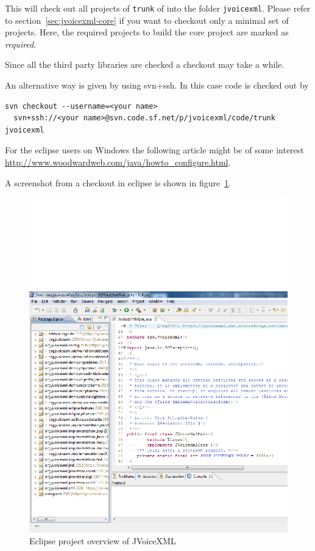 \documentclass[11pt,a4paper]{article}
\begin{document}
This will check out all projects of \texttt{trunk} of
into the folder \texttt{jvoicexml}. Please refer to
section~\ref{sec:jvoicexml-core} if you want to checkout
only a minimal set of projects. Here, the required projects
to build the core project are marked as \emph{required}.

Since all the third party libraries are checked a checkout may
take a while.

An alternative way is given by using svn+ssh. In this case code is checked out
by
\begin{lstlisting}
svn checkout --username=<your name>
  svn+ssh://<your name>@svn.code.sf.net/p/jvoicexml/code/trunk jvoicexml
\end{lstlisting}

For the eclipse users on Windows the following article might be of some interest
\url{http://www.woodwardweb.com/java/howto_configure.html}. 

A screenshot from a checkout in eclipse is shown in
figure~\ref{fig:eclipse-projects}.
\begin{figure}
\includegraphics[width=\linewidth]{eclipse-projects.png}
\caption{Eclipse project overview of JVoiceXML}
\label{fig:eclipse-projects}
\end{figure}
\end{document}
